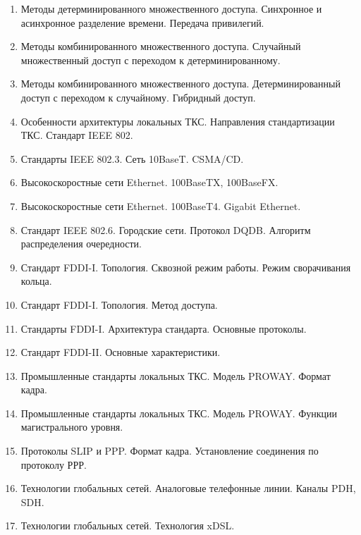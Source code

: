 \documentclass[12pt, russian, oneside, article]{ncc}
\begin{document}
\begin{enumerate}
\item Методы детерминированного множественного доступа. Синхронное и асинхронное разделение времени. Передача привилегий.
\item Методы комбинированного множественного доступа. Случайный множественный доступ с переходом к детерминированному.
\item Методы комбинированного множественного доступа. Детерминированный доступ с переходом к случайному. Гибридный доступ.
\item Особенности архитектуры локальных ТКС. Направления стандартизации ТКС. Стандарт IEEE 802.
\item Стандарты IEEE 802.3. Сеть 10BaseT. CSMA/CD.
\item Высокоскоростные сети Ethernet. 100BaseTX, 100BaseFX.
\item Высокоскоростные сети Ethernet. 100BaseT4. Gigabit Ethernet.
\item Стандарт IEEE 802.6. Городские сети. Протокол DQDB. Алгоритм распределения очередности.
\item Стандарт FDDI-I. Топология. Сквозной режим работы. Режим сворачивания кольца.
\item Стандарт FDDI-I. Топология. Метод доступа.
\item Стандарты FDDI-I. Архитектура стандарта. Основные протоколы.
\item Стандарт FDDI-II. Основные характеристики.
\item Промышленные стандарты локальных ТКС. Модель PROWAY. Формат кадра.
\item Промышленные стандарты локальных ТКС. Модель PROWAY. Функции магистрального уровня.
\item Протоколы SLIP и PPP. Формат кадра. Установление соединения по протоколу РРР.
\item Технологии глобальных сетей. Аналоговые телефонные линии. Каналы PDH, SDH.
\item Технологии глобальных сетей. Технология xDSL.
\end{enumerate}
\end{document}
